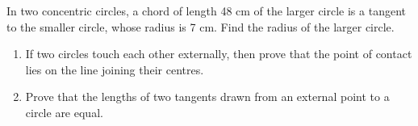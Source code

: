 \documentclass[12pt]{exam}
\begin{document}
\begin{questions}
\question 
In two concentric circles, a chord of length 48 cm of the larger circle is a tangent to the smaller circle, whose radius is 7 cm. Find the radius of the larger circle.
\\

\question
	\begin{enumerate}
		\item If two circles touch each other externally, then prove that the point of contact lies on the line joining their centres.

		\item Prove that the lengths of two tangents drawn from an
external point to a circle are equal.
\end{enumerate}
\end{questions}
\end{document}
